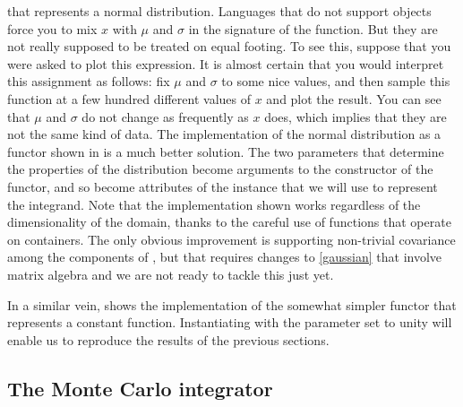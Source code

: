 %
that represents a normal distribution. Languages that do not support objects force you to mix
$x$ with $\mu$ and $\sigma$ in the signature of the function. But they are not really supposed
to be treated on equal footing. To see this, suppose that you were asked to plot this
expression. It is almost certain that you would interpret this assignment as follows: fix $\mu$
and $\sigma$ to some nice values, and then sample this function at a few hundred different
values of $x$ and plot the result. You can see that $\mu$ and $\sigma$ do not change as
frequently as $x$ does, which implies that they are not the same kind of data. The
implementation of the normal distribution as a functor shown in  is
a much better solution.
%
%
The two parameters that determine the properties of the distribution become arguments to the
constructor of the functor, and so become attributes of the instance that we will use to
represent the integrand. Note that the implementation shown works regardless of the
dimensionality of the domain, thanks to the careful use of functions that operate on
containers. The only obvious improvement is supporting non-trivial covariance among the
components of , but that requires changes to \eqref{gaussian} that involve
matrix algebra and we are not ready to tackle this just yet.

In a similar vein,  shows the implementation of the somewhat
simpler functor  that represents a constant function. Instantiating
 with the parameter  set to unity will enable us to
reproduce the results of the previous sections.
%
%

\subsection{The Monte Carlo integrator}
\label{sec:classes:driver:final}

